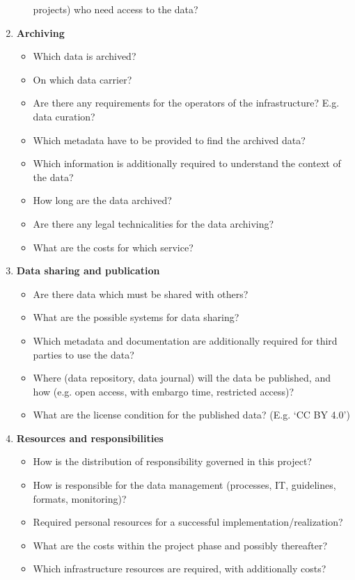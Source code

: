 \begin{enumerate}[start=0, label=\textbf{\arabic*})]
\begin{itemize}
                projects) who need access to the data?
        \end{itemize}
  \item \textbf{Archiving}
        \begin{itemize}
          \item Which data is archived?
          \item On which data carrier?
          \item Are there any requirements for the operators of the
                infrastructure? E.g. data curation?
          \item Which metadata have to be provided to find the archived data?
          \item Which information is additionally required to understand the
                context of the data?
          \item How long are the data archived?
          \item Are there any legal technicalities for the data archiving?
          \item What are the costs for which service?
        \end{itemize}
  \item \textbf{Data sharing and publication}
        \begin{itemize}
          \item Are there data which must be shared with others?
          \item What are the possible systems for data sharing?
          \item Which metadata and documentation are additionally required for
                third parties to use the data?
          \item Where (data repository, data journal) will the data be
                published, and how (e.g. open access, with embargo time,
                restricted access)?
          \item What are the license condition for the published data?
                (E.g. `CC BY 4.0')
        \end{itemize}
  \item \textbf{Resources and responsibilities}
        \begin{itemize}
          \item How is the distribution of responsibility governed in this project?
          \item How is responsible for the data management (processes, IT,
                guidelines, formats, monitoring)?
          \item Required personal resources for a successful
                implementation/realization?
          \item What are the costs within the project phase and
                possibly thereafter?
          \item Which infrastructure resources are required, with additionally
                costs?
        \end{itemize}
\end{enumerate}
